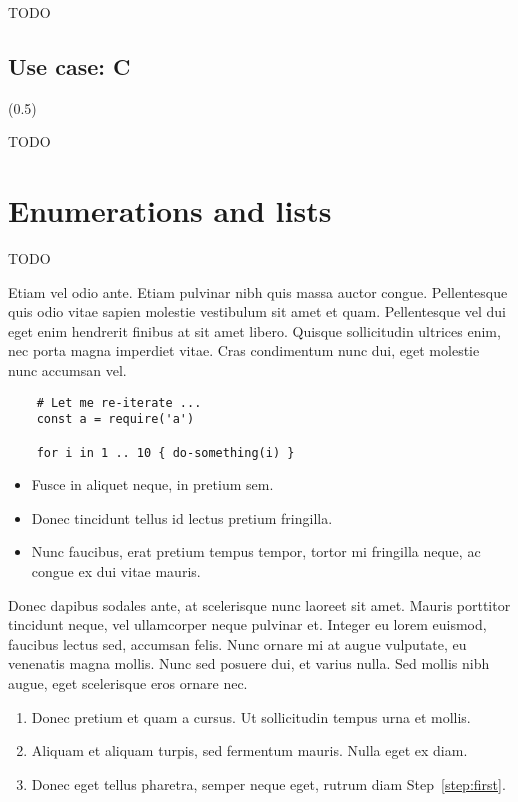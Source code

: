 TODO

\subsection{Use case: C} (0.5)

TODO

\section{Enumerations and lists}

TODO

Etiam vel odio ante. Etiam pulvinar nibh quis massa auctor congue. Pellentesque quis odio vitae sapien molestie vestibulum sit amet et quam. Pellentesque vel dui eget enim hendrerit finibus at sit amet libero. Quisque sollicitudin ultrices enim, nec porta magna imperdiet vitae. Cras condimentum nunc dui, eget molestie nunc accumsan vel.

\begin{lstlisting}
	# Let me re-iterate ...
	const a = require('a')
	
	for i in 1 .. 10 { do-something(i) }
\end{lstlisting}


\begin{itemize}
	\item Fusce in aliquet neque, in pretium sem.
	\item Donec tincidunt tellus id lectus pretium fringilla.
	\item Nunc faucibus, erat pretium tempus tempor, tortor mi fringilla neque, ac congue ex dui vitae mauris.
\end{itemize}

Donec dapibus sodales ante, at scelerisque nunc laoreet sit amet. Mauris porttitor tincidunt neque, vel ullamcorper neque pulvinar et. Integer eu lorem euismod, faucibus lectus sed, accumsan felis. Nunc ornare mi at augue vulputate, eu venenatis magna mollis. Nunc sed posuere dui, et varius nulla. Sed mollis nibh augue, eget scelerisque eros ornare nec.

\begin{enumerate}
	\item\label{step:first} Donec pretium et quam a cursus. Ut sollicitudin tempus urna et mollis.
	\item Aliquam et aliquam turpis, sed fermentum mauris. Nulla eget ex diam.
	\item Donec eget tellus pharetra, semper neque eget, rutrum diam Step~\ref{step:first}.
\end{enumerate}

